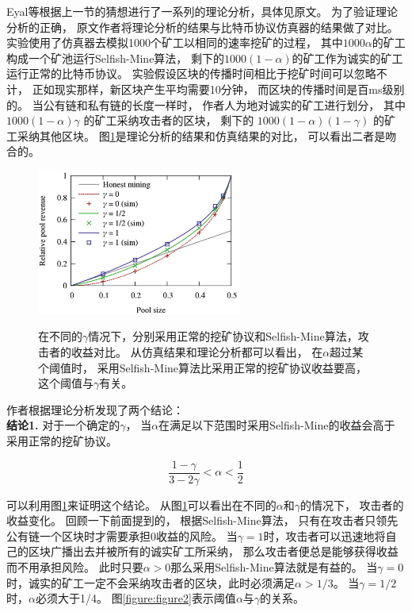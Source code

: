 \documentclass[a4paper, 11pt]{article}
\begin{document}
\begin{CJK*}{UTF8}{gbsn}
    Eyal等根据上一节的猜想进行了一系列的理论分析，具体见原文\cite{ref_selfish_mining1}。
    为了验证理论分析的正确，
    原文作者将理论分析的结果与比特币协议仿真器的结果做了对比。
    实验使用了仿真器去模拟1000个矿工以相同的速率挖矿的过程，
    其中$1000\alpha$的矿工构成一个矿池运行Selfish-Mine算法，
    剩下的$1000(1-\alpha)$的矿工作为诚实的矿工运行正常的比特币协议。
    实验假设区块的传播时间相比于挖矿时间可以忽略不计，
    正如现实那样，新区块产生平均需要10分钟，
    而区块的传播时间是百ms级别的。
    当公有链和私有链的长度一样时，
    作者人为地对诚实的矿工进行划分，
    其中 $1000(1-\alpha)\gamma$ 的矿工采纳攻击者的区块，
    剩下的 $1000(1-\alpha)(1-\gamma)$ 的矿工采纳其他区块。
    图\ref{figure:figure1}是理论分析的结果和仿真结果的对比，
    可以看出二者是吻合的。

    \begin{figure}[h]
        \centering
        \includegraphics[width=0.6\textwidth]{figure1}
        \label{figure:figure1}
        \caption{在不同的$\gamma$情况下，分别采用正常的挖矿协议和Selfish-Mine算法，攻击者的收益对比。
        从仿真结果和理论分析都可以看出，
        在$\alpha$超过某个阈值时，
        采用Selfish-Mine算法比采用正常的挖矿协议收益要高，
        这个阈值与$\gamma$有关。}
    \end{figure}

    作者根据理论分析发现了两个结论：\\

    \textbf{结论1.} 对于一个确定的$\gamma$，
    当$\alpha$在满足以下范围时采用Selfish-Mine的收益会高于采用正常的挖矿协议。

    \begin{equation}
        \frac{1-\gamma}{3-2\gamma} < \alpha < \frac{1}{2}
    \end{equation}

    可以利用图\ref{figure:figure1}来证明这个结论。
    从图\ref{figure:figure1}可以看出在不同的$\alpha$和$\gamma$的情况下，
    攻击者的收益变化。
    回顾一下前面提到的，
    根据Selfish-Mine算法，
    只有在攻击者只领先公有链一个区块时才需要承担0收益的风险。
    当$\gamma = 1$时，攻击者可以迅速地将自己的区块广播出去并被所有的诚实矿工所采纳，
    那么攻击者便总是能够获得收益而不用承担风险。
    此时只要$\alpha > 0$那么采用Selfish-Mine算法就是有益的。
    当$\gamma = 0$时，诚实的矿工一定不会采纳攻击者的区块，此时必须满足$\alpha > 1/3$。
    当$\gamma = 1/2$时，$\alpha$必须大于1/4。
    图\ref{figure:figure2}表示阈值$\alpha$与$\gamma$的关系。\\


\end{CJK*}
\end{document}
